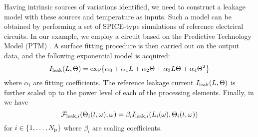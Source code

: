Having intrinsic sources of variations identified, we need to construct a leakage model with these sources and temperature as inputs. Such a model can be obtained by performing a set of SPICE-type simulations of reference electrical circuits. In our example, we employ a circuit based on the Predictive Technology Model (PTM) \cite{ptm}. A surface fitting procedure is then carried out on the output data, and the following exponential model is acquired:
\begin{equation} \elabel{leakage-current}
  I_\leak(\Leff, \T) = \text{exp} \big\{ \alpha_0 + \alpha_1 \Leff + \alpha_2 \T + \alpha_3 \Leff \T + \alpha_4 \T^2 \big\}
\end{equation}
where $\alpha_i$ are fitting coefficients. The reference leakage current $I_{\text{leak}}(L, \Theta)$ is further scaled up to the power level of each of the processing elements. Finally, in  we have
\[
  \mathcal{F}_{\text{leak}, i}(\Theta_i(t, \omega), \omega) = \beta_i I_{\text{leak}, i}(L_i(\omega), \Theta_i(t, \omega))
\]
for $i \in \{ 1, \dotsc, {N_\text{p}} \}$ where $\beta_i$ are scaling coefficients.
